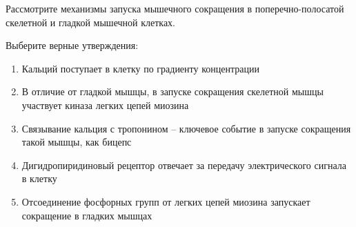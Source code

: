 
Рассмотрите механизмы запуска мышечного сокращения
в поперечно-полосатой скелетной и гладкой мышечной клетках.


Выберите
верные утверждения:

\begin{enumerate}
    \item Кальций поступает в клетку по градиенту концентрации
    \item В отличие от гладкой мышцы, в запуске сокращения скелетной мышцы участвует киназа легких цепей миозина
    \item Связывание кальция с тропонином – ключевое событие в запуске сокращения такой мышцы, как бицепс
    \item Дигидропиридиновый рецептор отвечает за передачу электрического сигнала в клетку
    \item Отсоединение фосфорных групп от легких цепей миозина запускает сокращение в гладких мышцах
\end{enumerate}

\explanationSection


